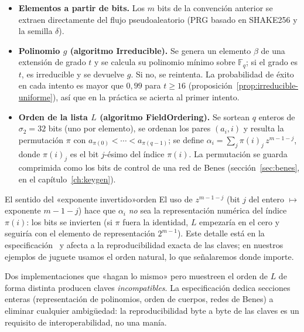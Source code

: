 \documentclass[11pt,a4paper,oneside]{report}
\newcommand{\GF}[1]{\mathbb{F}_{#1}}
\begin{document}
\begin{itemize}[leftmargin=1.4em,itemsep=3pt]
  \item \textbf{Elementos a partir de bits.} Los $m$ bits de la convención
        anterior se extraen directamente del flujo pseudoaleatorio (PRG
        basado en SHAKE256 y la semilla $\delta$).
  \item \textbf{Polinomio $g$ (algoritmo \textsf{Irreducible}).} Se genera un
        elemento $\beta$ de una extensión de grado $t$ y se calcula su
        polinomio mínimo sobre $\GF{q}$; si el grado es $t$, es irreducible
        y se devuelve $g$. Si no, se reintenta. La probabilidad de éxito en
        cada intento es mayor que $0{,}99$ para $t\ge16$
        (proposición~\ref{prop:irreducible-uniforme}), así que en la
        práctica se acierta al primer intento.
  \item \textbf{Orden de la lista $L$ (algoritmo \textsf{FieldOrdering}).}
        Se sortean $q$ enteros de $\sigma_2=32$ bits (uno por elemento),
        se ordenan los pares $(a_i,i)$ y resulta la permutación $\pi$ con
        $a_{\pi(0)}<\cdots<a_{\pi(q-1)}$; se define
        $\alpha_i=\sum_j \pi(i)_j\,z^{m-1-j}$, donde $\pi(i)_j$ es el bit
        $j$-ésimo del índice $\pi(i)$. La permutación se guarda comprimida
        como los bits de control de una red de Benes
        (sección~\ref{sec:benes}, en el capítulo~\ref{ch:keygen}).
\end{itemize}

\begin{observacion}{El sentido del «exponente invertido»}{orden}
El uso de $z^{m-1-j}$ (bit $j$ del entero $\mapsto$ exponente $m-1-j$) hace
que $\alpha_i$ \emph{no} sea la representación numérica del índice
$\pi(i)$: los bits se invierten (si $\pi$ fuera la identidad, $L$
empezaría en el cero y seguiría con el elemento de representación
$2^{m-1}$). Este detalle está en la
especificación~\cite{cmspec} y afecta a la reproducibilidad exacta de las
claves; en nuestros ejemplos de juguete usamos el orden natural, lo que
señalaremos donde importe.
\end{observacion}

\begin{practica}
Dos implementaciones que «hagan lo mismo» pero muestreen el orden de $L$ de
forma distinta producen claves \emph{incompatibles}. La especificación
dedica secciones enteras (representación de polinomios, orden de cuerpos,
redes de Benes) a eliminar cualquier ambigüedad: la reproducibilidad byte a
byte de las claves es un requisito de interoperabilidad, no una manía.
\end{practica}
\end{document}
